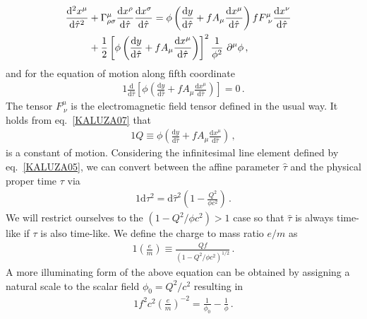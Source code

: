 \begin{alignat}{2}
	\notag\frac{\mathrm{d}^{2}x^{\mu}}{\mathrm{d}\hat{\tau}^{2}}&+\Gamma^{\mu}_{\rho\sigma}\frac{\mathrm{d}x^{\rho}}{\mathrm{d}\hat{\tau}}\frac{\mathrm{d}x^{\sigma}}{\mathrm{d}\hat{\tau}}=\phi\left(\frac{\mathrm{d}y}{\mathrm{d}\hat{\tau}}+fA_{\mu}\frac{\mathrm{d}x^{\mu}}{\mathrm{d}\hat{\tau}}\right)fF^{\mu}_{\ \nu}\frac{\mathrm{d}x^{\nu}}{\mathrm{d}\hat{\tau}}&&\\
	\label{KALUZA06}&+\frac{1}{2}\left[\phi\left(\frac{\mathrm{d}y}{\mathrm{d}\hat{\tau}}+fA_{\mu}\frac{\mathrm{d}x^{\mu}}{\mathrm{d}\hat{\tau}}\right)\right]^{2}\frac{1}{\phi^{2}}\ \partial^{\mu}\phi\,,&&
\end{alignat}
and for the equation of motion along fifth coordinate
\begin{alignat}{1}
	\label{KALUZA07} \frac{\mathrm{d}}{\mathrm{d}\hat{\tau}}\left[\phi\left(\frac{\mathrm{d}y}{\mathrm{d}\hat{\tau}}+fA_{\mu}\frac{\mathrm{d}x^{\mu}}{\mathrm{d}\hat{\tau}}\right)\right]=0\,.
\end{alignat}
The tensor $F^{\mu}_{\ \nu}$ is the electromagnetic field tensor defined in the usual way. It holds from eq.~\eqref{KALUZA07} that
\begin{alignat}{1}
	\label{KALUZA08} Q\equiv\phi\left(\frac{\mathrm{d}y}{\mathrm{d}\hat{\tau}}+fA_{\mu}\frac{\mathrm{d}x^{\mu}}{\mathrm{d}\hat{\tau}}\right)\,,
\end{alignat}
is a constant of motion. Considering the infinitesimal line element defined by eq.~\eqref{KALUZA05}, we can convert between the affine parameter $\hat{\tau}$ and the physical proper time $\tau$ via
\begin{alignat}{1}
	\label{KALUZA09} \mathrm{d}\tau^{2}=\mathrm{d}\hat{\tau}^{2}\left(1-\frac{Q^{2}}{\phi c^{2}}\right)\,.
\end{alignat}
We will restrict ourselves to the $(1-Q^{2}/\phi c^{2})>1$ case so that $\hat{\tau}$ is always time-like if $\tau$ is also time-like. We define the charge to mass ratio $e/m$ as
\begin{alignat}{1}
	\label{KALUZA10} \left(\frac{e}{m}\right)\equiv\frac{Qf}{\left(1-Q^{2}/\phi c^{2}\right)^{1/2}}\,.
\end{alignat}
A more illuminating form of the above equation can be obtained by assigning a natural scale to the scalar field $\phi_{0}=Q^{2}/c^{2}$ resulting in
\begin{alignat}{1}
	\label{KALUZA11} f^{2}c^{2}\left(\frac{e}{m}\right)^{-2}=\frac{1}{\phi_0}-\frac{1}{\phi}\,.
\end{alignat}
